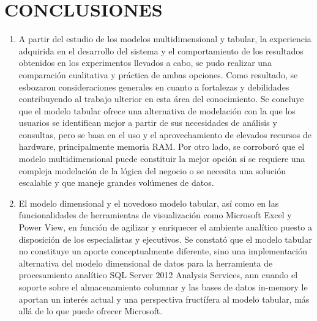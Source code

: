 \section{CONCLUSIONES}
\begin{enumerate}
\item  A partir del estudio de los modelos multidimensional y tabular, la experiencia adquirida en el desarrollo del sistema y el comportamiento de los resultados obtenidos en los experimentos llevados a cabo, se pudo realizar una comparaci\'{o}n cualitativa y pr\'{a}ctica de ambas opciones. Como resultado, se esbozaron consideraciones generales en cuanto a fortalezas y debilidades contribuyendo al trabajo ulterior en esta \'{a}rea del conocimiento. Se concluye que el modelo tabular ofrece una alternativa de modelaci\'{o}n con la que los usuarios se identifican mejor a partir de sus necesidades de an\'{a}lisis y consultas, pero se basa en el uso y el aprovechamiento de elevados recursos de hardware, principalmente memoria RAM. Por otro lado, se corrobor\'{o} que el modelo multidimensional puede constituir la mejor opci\'{o}n si se requiere una compleja modelaci\'{o}n de la l\'{o}gica del negocio o se necesita una soluci\'{o}n escalable y que maneje grandes vol\'{u}menes de datos.

\item  El modelo dimensional y el novedoso modelo tabular, as\'{i} como en las funcionalidades de herramientas de visualizaci\'{o}n como Microsoft Excel y Power View, en funci\'{o}n de agilizar y enriquecer el ambiente anal\'{i}tico puesto a disposici\'{o}n de los especialistas y ejecutivos. Se constat\'{o} que el modelo tabular no constituye un aporte conceptualmente diferente, sino una implementaci\'{o}n alternativa del modelo dimensional de datos para la herramienta de procesamiento anal\'{i}tico SQL Server 2012 Analysis Services, aun cuando el soporte sobre el almacenamiento columnar y las bases de datos in-memory le aportan un inter\'{e}s actual y una perspectiva fruct\'{i}fera al modelo tabular, m\'{a}s all\'{a} de lo que puede ofrecer Microsoft.
\end{enumerate}










